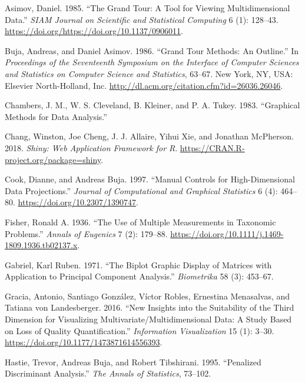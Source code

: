 \documentclass[
  11,
]{article}
\begin{document}
\leavevmode\hypertarget{ref-asimov_grand_1985}{}%
Asimov, Daniel. 1985. ``The Grand Tour: A Tool for Viewing Multidimensional Data.'' \emph{SIAM Journal on Scientific and Statistical Computing} 6 (1): 128--43. \url{https://doi.org/https://doi.org/10.1137/0906011}.

\leavevmode\hypertarget{ref-buja_grand_1986}{}%
Buja, Andreas, and Daniel Asimov. 1986. ``Grand Tour Methods: An Outline.'' In \emph{Proceedings of the Seventeenth Symposium on the Interface of Computer Sciences and Statistics on Computer Science and Statistics}, 63--67. New York, NY, USA: Elsevier North-Holland, Inc. \url{http://dl.acm.org/citation.cfm?id=26036.26046}.

\leavevmode\hypertarget{ref-chambers_graphical_1983}{}%
Chambers, J. M., W. S. Cleveland, B. Kleiner, and P. A. Tukey. 1983. ``Graphical Methods for Data Analysis.''

\leavevmode\hypertarget{ref-chang_shiny:_2018}{}%
Chang, Winston, Joe Cheng, J. J. Allaire, Yihui Xie, and Jonathan McPherson. 2018. \emph{Shiny: Web Application Framework for R}. \url{https://CRAN.R-project.org/package=shiny}.

\leavevmode\hypertarget{ref-cook_manual_1997}{}%
Cook, Dianne, and Andreas Buja. 1997. ``Manual Controls for High-Dimensional Data Projections.'' \emph{Journal of Computational and Graphical Statistics} 6 (4): 464--80. \url{https://doi.org/10.2307/1390747}.

\leavevmode\hypertarget{ref-fisher_use_1936}{}%
Fisher, Ronald A. 1936. ``The Use of Multiple Measurements in Taxonomic Problems.'' \emph{Annals of Eugenics} 7 (2): 179--88. \url{https://doi.org/10.1111/j.1469-1809.1936.tb02137.x}.

\leavevmode\hypertarget{ref-gabriel_biplot_1971}{}%
Gabriel, Karl Ruben. 1971. ``The Biplot Graphic Display of Matrices with Application to Principal Component Analysis.'' \emph{Biometrika} 58 (3): 453--67.

\leavevmode\hypertarget{ref-gracia_new_2016}{}%
Gracia, Antonio, Santiago González, Víctor Robles, Ernestina Menasalvas, and Tatiana von Landesberger. 2016. ``New Insights into the Suitability of the Third Dimension for Visualizing Multivariate/Multidimensional Data: A Study Based on Loss of Quality Quantification.'' \emph{Information Visualization} 15 (1): 3--30. \url{https://doi.org/10.1177/1473871614556393}.

\leavevmode\hypertarget{ref-hastie_penalized_1995}{}%
Hastie, Trevor, Andreas Buja, and Robert Tibshirani. 1995. ``Penalized Discriminant Analysis.'' \emph{The Annals of Statistics}, 73--102.
\end{document}
